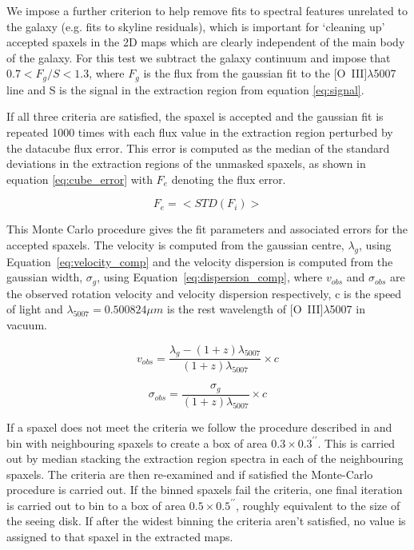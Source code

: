 \documentclass[fleqn,usenatbib]{mn2e}
\begin{document}
We impose a further criterion to help remove fits to spectral features unrelated to the galaxy (e.g. fits to skyline residuals), which is important for `cleaning up' accepted spaxels in the 2D maps which are clearly independent of the main body of the galaxy. For this test we subtract the galaxy continuum and impose that $0.7 < F_{g}/{S} < 1.3$, where $F_{g}$ is the flux from the gaussian fit to the [O~{\sc III}]$\lambda$5007 line and S is the signal in the extraction region from equation \ref{eq:signal}.

If all three criteria are satisfied, the spaxel is accepted and the gaussian fit is repeated 1000 times with each flux value in the extraction region perturbed by the datacube flux error.
This error is computed as the median of the standard deviations in the extraction regions of the unmasked spaxels, as shown in equation \ref{eq:cube_error} with $F_{e}$ denoting the flux error.  

\begin{equation}\label{eq:cube_error}
   F_{e} = \big<STD(F _{i})\big>
\end{equation}

This Monte Carlo procedure gives the fit parameters and associated errors for the accepted spaxels.
The velocity is computed from the gaussian centre, $\lambda_{g}$, using Equation~\ref{eq:velocity_comp} and the velocity dispersion is computed from the gaussian width, $\sigma_{g}$, using Equation~\ref{eq:dispersion_comp}, where $v_{obs}$ and $\sigma_{obs}$ are the observed rotation velocity and velocity dispersion respectively, c is the speed of light and $\lambda_{5007} = 0.500824\mu m$ is the rest wavelength of [O~{\sc III}]$\lambda$5007 in vacuum.

\begin{equation}\label{eq:velocity_comp}
   v_{obs} = \frac{\lambda_{g} - (1 + z)\lambda_{5007}}{(1 + z)\lambda_{5007}} \times c
\end{equation}

\begin{equation}\label{eq:dispersion_comp}
   \sigma_{obs} = \frac{\sigma_{g}}{(1 + z)\lambda_{5007}} \times c
\end{equation}

If a spaxel does not meet the criteria we follow the procedure described in \cite{Stott2016} and bin with neighbouring spaxels to create a box of area $0.3\times0.3^{\prime\prime}$.
This is carried out by median stacking the extraction region spectra in each of the neighbouring spaxels.
The criteria are then re-examined and if satisfied the Monte-Carlo procedure is carried out. 
If the binned spaxels fail the criteria, one final iteration is carried out to bin to a box of area $0.5\times0.5^{\prime\prime}$, roughly equivalent to the size of the seeing disk.
If after the widest binning the criteria aren't satisfied, no value is assigned to that spaxel in the extracted maps. \\
\end{document}
